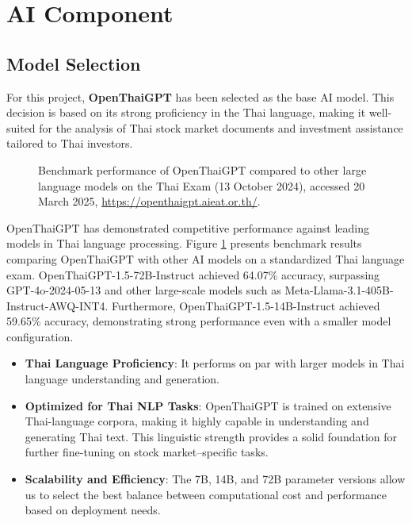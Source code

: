 \section{AI Component}
\label{section:ai-component}

\subsection{Model Selection}
\label{subsection:model-selection}

For this project, \textbf{OpenThaiGPT} has been selected as the base AI model. This decision is based on its strong proficiency in the Thai language, 
making it well-suited for the analysis of Thai stock market documents and investment assistance tailored to Thai investors\cite{yuenyong2024openthaigpt15thaicentricopen}.

\begin{figure}[h]
    \centering
    \caption[Performance of OpenThaiGPT on Thai Exam Benchmark]{Benchmark performance of OpenThaiGPT compared to other large language models on the Thai Exam (13 October 2024), accessed 20 March 2025, \url{https://openthaigpt.aieat.or.th/}.}
    \label{fig:openthaigpt-thai-exam-benchmark}
\end{figure}

\FloatBarrier

OpenThaiGPT has demonstrated competitive performance against leading models in Thai language processing.
Figure \ref{fig:openthaigpt-thai-exam-benchmark} presents benchmark results comparing OpenThaiGPT with other AI models on a standardized Thai language exam.
OpenThaiGPT-1.5-72B-Instruct achieved 64.07\% accuracy, surpassing GPT-4o-2024-05-13 and other large-scale models such as Meta-Llama-3.1-405B-Instruct-AWQ-INT4. 
Furthermore, OpenThaiGPT-1.5-14B-Instruct achieved 59.65\% accuracy, demonstrating strong performance even with a smaller model configuration\cite{OpenThaiGPT}.

\begin{itemize}[leftmargin=60pt]
    \item \textbf{Thai Language Proficiency}: It performs on par with larger models in Thai language understanding and generation.
    \item \textbf{Optimized for Thai NLP Tasks}: OpenThaiGPT is trained on extensive Thai-language corpora, making it highly capable in understanding and generating Thai text. This linguistic strength provides a solid foundation for further fine-tuning on stock market–specific tasks.
    \item \textbf{Scalability and Efficiency}: The 7B, 14B, and 72B parameter versions allow us to select the best balance between computational cost and performance based on deployment needs.
\end{itemize}

